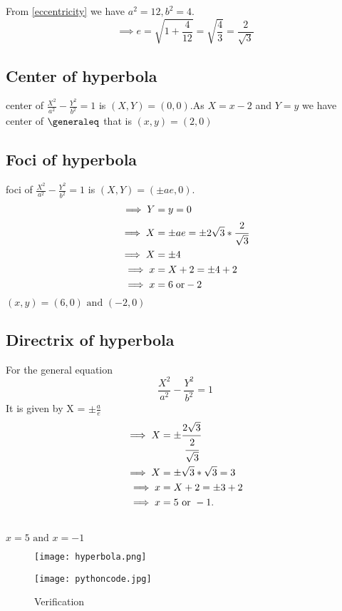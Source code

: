 \documentclass[journal,12pt,twocolumn]{article}
\newcommand{\generaleqa}{\frac{X^2}{a^2} - \frac{Y^2}{b^2} = 1}
\begin{document}
From \eqref{eccentricity} we have $a^2 = 12 , b^2 = 4$.
\begin{equation}
\implies e = \sqrt{1+\frac{4}{12}} =\sqrt{\frac{4}{3}} =\frac{2}{\sqrt{3}}    
\end{equation}

  \subsection*{Center of hyperbola}
  center of $\generaleqa$ is $(X,Y) = (0,0)$.As $X = x-2$ and $Y = y$
  we have center of $ \generaleq $ that is $(x,y) = (2,0)$ \\
  
  \subsection*{Foci of hyperbola}
  foci of $\generaleqa$ is $(X,Y) = (\pm ae,0)$.
  \begin{align}
  \implies Y &= y = 0 \nonumber \\
  \implies X &= \pm ae = \pm 2\sqrt{3} * \cfrac{2}{\sqrt{3}} \nonumber\\
  \implies X &= \pm 4 \nonumber \\
  \implies x &= X+2 = \pm 4 + 2 \nonumber \\
  \implies x &= 6 \; \text{or} -2    
  \end{align}
  \therefore {}$(x,y) = (6,0) \text{ and } (-2,0)$ \\
  \pagebreak

\subsection*{Directrix of hyperbola}
   For the general equation $$\generaleqa$$ It is
   given by X = $\pm \frac{a}{e}$\\
   \columnbreak
  \begin{align}
      \implies X &= \pm \cfrac{2\sqrt{3}}{\cfrac{2}{\sqrt{3}}} \nonumber \\
      \implies X &= \pm \sqrt{3}*\sqrt{3} = 3 \nonumber \\
      \implies x &= X+2 = \pm3+2 \nonumber \\
      \implies x &= 5 \text{ or } -1.
  \end{align}
  \begin{center}
  \therefore {}\\
      $x=5 \text{ and } x = -1$
  \end{center}
     
\begin{figure}[H]
    \centering
    \texttt{[image: hyperbola.png]}
    \label{fig:my_hyperbola}
\end{figure}

\begin{figure}[H]
    \centering
    \texttt{[image: pythoncode.jpg]}
    \caption*{Verification}
    \label{fig:my_code}
\end{figure}
\end{document}
